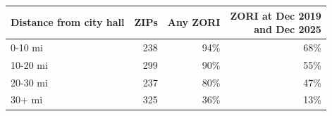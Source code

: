\footnotesize\setlength{\tabcolsep}{4pt}
\begin{tabular}{lrrr}
\toprule
Distance from city hall & ZIPs & Any ZORI & \shortstack[r]{ZORI at Dec 2019\\and Dec 2025} \\
\midrule
0-10 mi & 238 & 94\% & 68\% \\
10-20 mi & 299 & 90\% & 55\% \\
20-30 mi & 237 & 80\% & 47\% \\
30+ mi & 325 & 36\% & 13\% \\
\bottomrule
\end{tabular}
